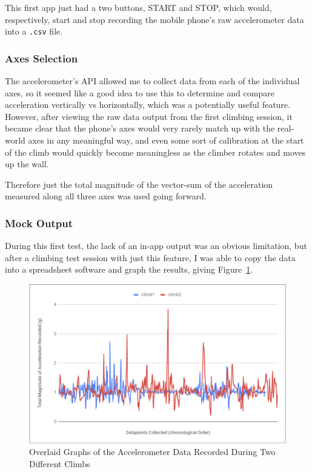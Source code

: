 This first app just had a two buttons, START and STOP, which would, respectively, start and stop recording the mobile phone's raw accelerometer data into a \verb|.csv| file.

\subsubsection{Axes Selection}
The accelerometer's API allowed me to collect data from each of the individual axes, so it seemed like a good idea to use this to determine and compare acceleration vertically vs horizontally, which was a potentially useful feature.
However, after viewing the raw data output from the first climbing session, it became clear that the phone's axes would very rarely match up with the real-world axes in any meaningful way, and even some sort of calibration at the start of the climb would quickly become meaningless as the climber rotates and moves up the wall.

Therefore just the total magnitude of the vector-sum of the acceleration measured along all three axes was used going forward.

\subsubsection{Mock Output}
During this first test, the lack of an in-app output was an obvious limitation, but after a climbing test session with just this feature, I was able to copy the data into a spreadsheet software and graph the results, giving Figure~\ref{fig:twoclimbsgraph}.

\begin{figure}[h]
\centering
\includegraphics[width=12cm]{imgs/graph_two_climbs}
\caption{Overlaid Graphs of the Accelerometer Data Recorded During Two Different Climbs}
\label{fig:twoclimbsgraph}
\end{figure}

